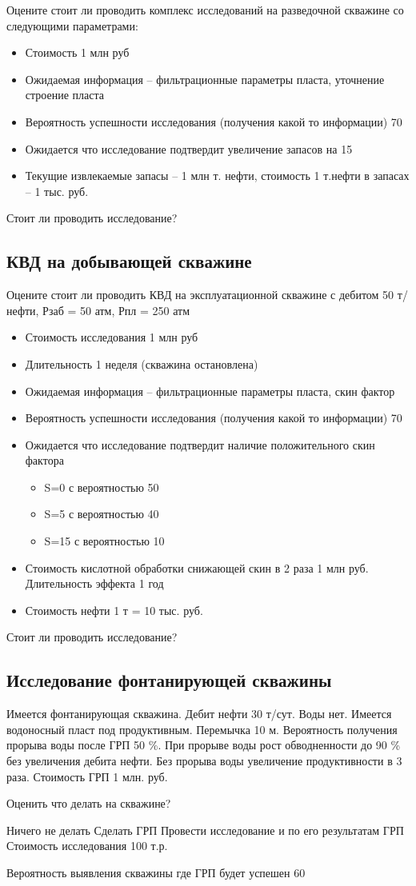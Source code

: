     
Оцените стоит ли проводить комплекс исследований на разведочной скважине со следующими параметрами:
\begin{itemize}
    \item Стоимость 1 млн руб
    \item Ожидаемая информация – фильтрационные параметры пласта, уточнение строение пласта
    \item Вероятность успешности исследования (получения какой то информации) 70%
    \item Ожидается что исследование подтвердит увеличение запасов на 15%
    \item Текущие извлекаемые запасы – 1 млн т. нефти, стоимость 1 т.нефти в запасах – 1 тыс. руб.
\end{itemize}     
Стоит ли проводить исследование? 

    
\subsection{КВД на добывающей скважине}

Оцените стоит ли проводить КВД на эксплуатационной скважине с дебитом 50 т/нефти, Рзаб = 50 атм, Рпл = 250 атм
\begin{itemize}
    \item Стоимость исследования 1 млн руб
    \item Длительность 1 неделя (скважина остановлена)
    \item Ожидаемая информация – фильтрационные параметры пласта, скин фактор
    \item Вероятность успешности исследования (получения какой то информации) 70%
    \item Ожидается что исследование подтвердит наличие положительного скин фактора
    \begin{itemize}
        \item S=0 с вероятностью 50%
        \item S=5 с вероятностью 40%
        \item S=15 с вероятностью 10%
    \end{itemize}
    \item Стоимость кислотной обработки снижающей скин в 2 раза 1 млн руб. Длительность эффекта 1 год
    \item Стоимость нефти 1 т = 10 тыс. руб.
\end{itemize}
Стоит ли проводить исследование? 

\subsection{Исследование фонтанирующей скважины}
Имеется фонтанирующая скважина. Дебит нефти 30 т/сут. Воды нет. Имеется водоносный пласт под продуктивным. Перемычка 10 м. Вероятность получения прорыва воды после ГРП 50 \%. При прорыве воды рост обводненности до 90 \% без увеличения дебита нефти. Без прорыва воды увеличение продуктивности в 3 раза. Стоимость ГРП 1 млн. руб.

Оценить что делать на скважине?

Ничего не делать
Сделать ГРП
Провести исследование и по его результатам ГРП
Стоимость исследования 100 т.р.

Вероятность выявления скважины где ГРП будет успешен 60%
